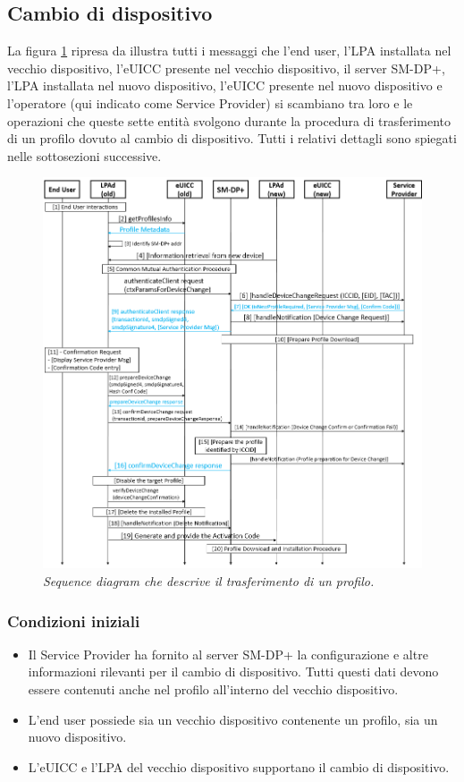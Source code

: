 \documentclass[10pt, oneside]{book}
\begin{document}
\subsection{Cambio di dispositivo}\label{sec:device-change}
La figura \ref{fig:device-change} ripresa da \cite{GSMA-docs-new} illustra tutti i messaggi che l'end user, l'LPA installata nel vecchio dispositivo, l'eUICC presente nel vecchio dispositivo, il server SM-DP+, l'LPA installata nel nuovo dispositivo, l'eUICC presente nel nuovo dispositivo e l'operatore (qui indicato come Service Provider) si scambiano tra loro e le operazioni che queste sette entità svolgono durante la procedura di trasferimento di un profilo dovuto al cambio di dispositivo. Tutti i relativi dettagli \cite{GSMA-docs-new} sono spiegati nelle sottosezioni successive.
\begin{figure}
\includegraphics[width=\linewidth]{device-change.png}
\caption{\textit{Sequence diagram che descrive il trasferimento di un profilo.}}
\label{fig:device-change}
\end{figure}

\subsubsection{Condizioni iniziali}
\begin{itemize}
\item Il Service Provider ha fornito al server SM-DP+ la configurazione e altre informazioni rilevanti per il cambio di dispositivo. Tutti questi dati devono essere contenuti anche nel profilo all'interno del vecchio dispositivo.
\item L'end user possiede sia un vecchio dispositivo contenente un profilo, sia un nuovo dispositivo.
\item L'eUICC e l'LPA del vecchio dispositivo supportano il cambio di dispositivo.
\end{itemize}
\end{document}
